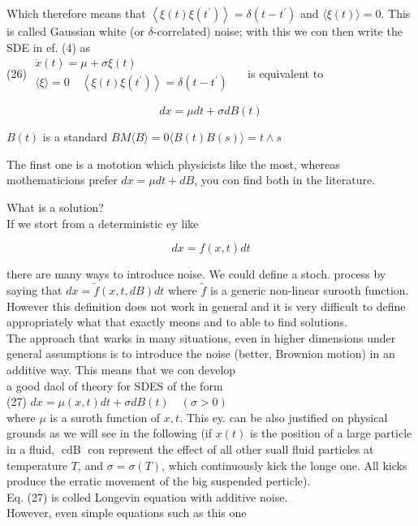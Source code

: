 \documentclass[10pt]{article}
\begin{document}
Which therefore means that $\left\langle\xi(t) \xi\left(t^{\prime}\right)\right\rangle=\delta\left(t-t^{\prime}\right)$ and $\langle\xi(t)\rangle=0$. This is called Gaussian white (or $\delta$-correlated) noise; with this we con then write the SDE in ef. (4) as\\
(26) $\begin{gathered}\dot{x}(t)=\mu+\sigma \xi(t) \\ \langle\xi\rangle=0 \quad\left\langle\xi(t) \xi\left(t^{\prime}\right)\right\rangle=\delta\left(t-t^{\prime}\right)\end{gathered} \quad$ is equivalent to

$$
d x=\mu d t+\sigma d B(t)
$$

$B(t)$ is a standard $B M \langle B\rangle=0\langle B(t) B(s)\rangle=t \wedge s$

The finst one is a mototion which physicists like the most, whereas mothematicions prefer $d x=\mu d t+d B$, you con find both in the literature.

What is a solution?\\
If we stort from a deterministic ey like

$$
d x=f(x, t) d t
$$

there are many ways to introduce noise. We could define a stoch. process by saying that $d x=\tilde{f}(x, t, d B) d t$ where $\tilde{f}$ is a generic non-linear surooth function. However this definition does not work in general and it is very difficult to define appropriately what that exactly meons and to able to find solutions.\\
The approach that warks in many situations, even in higher dimensions under general assumptions is to introduce the noise (better, Brownion motion) in an additive way. This means that we con develop\\
a good daol of theory for SDES of the form\\
(27) $d x=\mu(x, t) d t+\sigma d B(t) \quad(\sigma>0)$\\
where $\mu$ is a suroth function of $x, t$. This ey. can be also justified on physical grounds as we will see in the following (if $x(t)$ is the position of a large particle in a fluid, $\operatorname{cdB}$ con represent the effect of all other suall fluid particles at temperature $T$, and $\sigma=\sigma(T)$, which continuously kick the longe one. All kicks produce the erratic movement of the big suspended perticle).\\
Eq. (27) is colled Longevin equation with additive noise.\\
However, even simple equations such as this one
\end{document}
